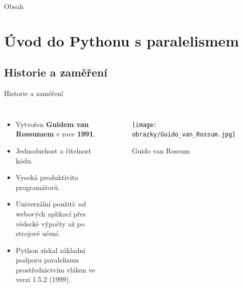 \documentclass{beamer}
\title{\thesisname}
\author{\authorname}
\institute{Univerzita Palackého v Olomouci}
\date{\today}
\begin{document}
\begin{frame}
	\titlepage
\end{frame}

\begin{frame}{Obsah}
	\tableofcontents
\end{frame}

\section{Úvod do Pythonu s paralelismem}
\subsection{Historie a zaměření}
\begin{frame}{Historie a zaměření}
    \begin{columns}
        \begin{itemize}
            \item Vytvořen \textbf{Guidem van Rossumem} v roce \textbf{1991}.
            \item Jednoduchost a čitelnost kódu.
            \item Vysoká produktivita programátorů.
            \item Univerzální použití: od webových aplikací přes vědecké výpočty až po strojové učení.
            \item Python získal základní podporu paralelismu prostřednictvím vláken ve verzi 1.5.2 (1999).
        \end{itemize}
        
        \begin{figure}
        		\texttt{[image: obrazky/Guido\_van\_Rossum.jpg]}
        		\caption{Guido van Rossum}
      		\end{figure}
    \end{columns}
\end{frame}
\end{document}
